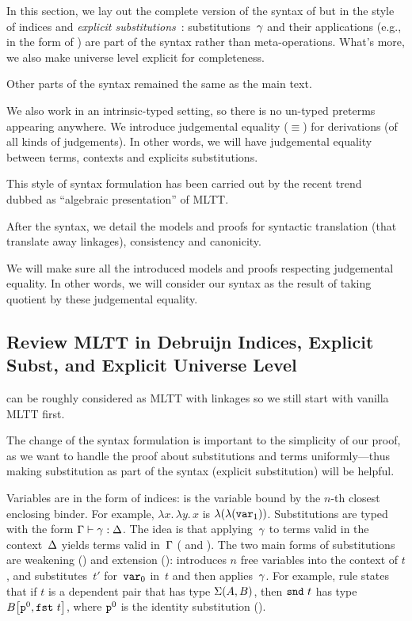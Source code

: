 In this section, we lay out the complete version of the syntax of \TT but in the style of \citeauthor{debruijn1964} indices and \emph{explicit substitutions}~\cite{substcalculus,abadi1989subst}:
substitutions~$\gamma$ and their applications (e.g., in the form of ) are part
of the syntax rather than meta-operations. What's more, we also make universe level explicit for completeness.

Other parts of the syntax remained the same as the main text.  

We also work in an intrinsic-typed setting, so there is no un-typed preterms appearing anywhere. We introduce judgemental equality ($\equiv$)
for derivations (of all kinds of judgements). In other words, we will have judgemental equality between terms, 
contexts and explicits substitutions. 

This style of syntax formulation has been carried out by the recent trend~\cite{altkap2016,coquand2018canonicity,gratzer-sterling-birkedal-2019} dubbed as ``algebraic presentation'' of MLTT. 


After the syntax, we detail the models and proofs for syntactic translation (that translate away linkages),  consistency and canonicity. 

We will make sure all the introduced models and proofs respecting judgemental equality. In other words, we will consider our syntax as the result of taking quotient by these judgemental equality.


\subsection{Review MLTT in Debruijn Indices, Explicit Subst, and Explicit Universe Level}

\TT can be roughly considered as MLTT with linkages so we still start with vanilla MLTT first.




  The change of the syntax formulation is important to the simplicity of our proof, as we want to handle the proof about substitutions and terms uniformly---thus making substitution as part of the syntax (explicit substitution) will be helpful. 

Variables are in the form of \citeauthor{debruijn1964} indices:
 is the variable bound by the $n$-th closest enclosing binder.
For example, $\lambda x.\,\lambda y.\,x$ is $\lambda({\lambda({\texttt{var}_{1}})})$.
%
Substitutions are typed with the form 
$ {\Gamma} \vdash {\ensuremath{\gamma}} : {\Delta} $.
The idea is that applying~$\gamma$ to terms valid in the context~$\Delta$
yields terms valid in~$\Gamma$ ( and ).
%
The two main forms of substitutions are weakening () and extension ():
 introduces $n$ free variables into the context of $t$, and
 substitutes~$t'$ for~$\texttt{var}_{0}$ in~$t$ and
then applies~$\gamma$.
For example, rule  states that if $t$ is a dependent pair
that has type $\Sigma({A},{B})$, then $\texttt{snd}~{t}$ has type
${B}\!\left[{{\texttt{p}^{0}},{\texttt{fst}~{t}}}\right]$,
where $\texttt{p}^{0}$ is the identity substitution ().

